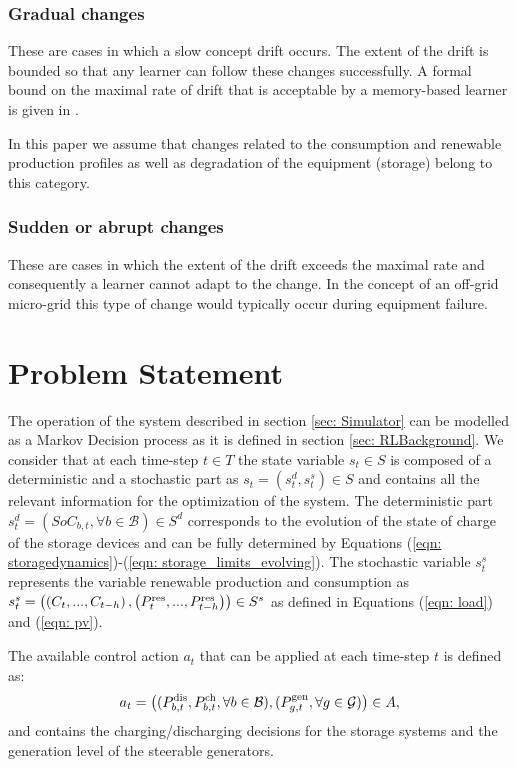 \documentclass{article}
\begin{document}
	\subsubsection{Gradual changes}
	These are cases in which a slow concept drift occurs. The extent of the drift is bounded so that any learner can follow these changes successfully. A formal bound on the maximal rate of drift that is acceptable by a memory-based learner is given in \cite{kuh1991learning}.
	
	In this paper we assume that changes related to the consumption and renewable production profiles as well as degradation of the equipment (storage) belong to this category.
	
	\subsubsection{Sudden or abrupt changes}
	These are cases in which the extent of the drift exceeds the maximal rate and consequently a learner cannot adapt to the change. In the concept of an off-grid micro-grid this type of change would typically occur during equipment failure. 

\section{Problem Statement} \label{sec: ProblemStatement}

    The operation of the system described in section \ref{sec: Simulator} can be modelled as a Markov Decision process as it is defined in section \ref{sec: RLBackground}. We consider that at each time-step $t \in T$ the state variable $s_t \in S$ is composed of a deterministic and a stochastic part as $s_t = \left(s_t^{d}, s_t^{s}\right) \in S$ and contains all the relevant information for the optimization of the system. The deterministic part $s_t^{d} = \left(SoC_{b,t},\forall b \in \mathcal{B}\right) \in S^{d}$ corresponds to the evolution of the state of charge of the storage devices and can be fully determined by Equations (\ref{eqn: storagedynamics})-(\ref{eqn: storage_limits_evolving}). The stochastic variable $s_t^{s}$ represents the variable renewable production and consumption as $s_t^{s} = \left(\left(C_t,...,C_{t-h}\right), \left(P^\text{res}_t,...,P^\text{res}_{t-h} \right)\right) \in S^{s}$ as defined in Equations (\ref{eqn: load}) and (\ref{eqn: pv}).
    
    The available control action $a_t$ that can be applied at each time-step $t$ is defined as:
    \begin{gather}
    a_t= \left((P^{\text{dis}}_{b,t},P^{\text{ch}}_{b,t}, \forall b \in \mathcal{B}), (P^\text{gen}_{g,t}, \forall g \in \mathcal{G}) \right) \in A,
    \end{gather}
    and contains the charging/discharging decisions for the storage systems and the generation level of the steerable generators.
    
\end{document}
